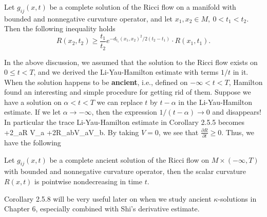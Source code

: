 \begin{corollary}
  \label{cor:cz-integrated-scalar-curvature-harnack-estimate}
Let $g_{ij}(x,t)$ be a complete solution of the Ricci flow on a
manifold with bounded and nonnegative curvature operator, and let
$x_1,x_2\in M,\ 0<t_1<t_2.$ Then the following inequality holds
$$
R(x_2,t_2)\geq\frac{t_1}{t_2}e^{-d_{t_1}(x_1,x_2)^2/2(t_2-t_1)}\cdot
R(x_1,t_1).$$
\end{corollary}

In the above discussion, we assumed that the solution to the Ricci
flow exists on $0\le t<T$, and we derived the Li-Yau-Hamilton
estimate with terms $1/t$ in it. When the solution happens to be
{\bf ancient},
i.e., defined on $-\infty<t<T$, Hamilton \cite{Ha93} found an
interesting and simple procedure for getting rid of them. Suppose
we have a solution on $\alpha<t<T$ we can replace $t$ by
$t-\alpha$ in the Li-Yau-Hamilton estimate. If we let $\alpha\to
-\infty$, then the expression $1/(t-\alpha)\to 0$ and disappears!
In particular the trace Li-Yau-Hamilton estimate in Corollary
2.5.5 becomes \be {}+2\nabla_aR\cdot
V_a
+2R_{ab}V_aV_b.%
\ee By taking $V=0$, we see that $\frac{\partial R}{\partial
t}\geq 0$. Thus, we have the following

\begin{corollary}
  \label{cor:cz-scalar-curvature-monotonicity-for-ancient-solutions}
Let $g_{ij}(x,t)$ be a complete ancient solution of the Ricci flow
on $M\times (-\infty, T)$ with bounded and nonnegative curvature
operator, then the scalar curvature $R(x,t)$ is pointwise
nondecreasing in time $t$.
\end{corollary}

Corollary 2.5.8  will be very useful later on when we study
ancient $\kappa$-solutions in Chapter 6, especially combined with
Shi's derivative estimate.

